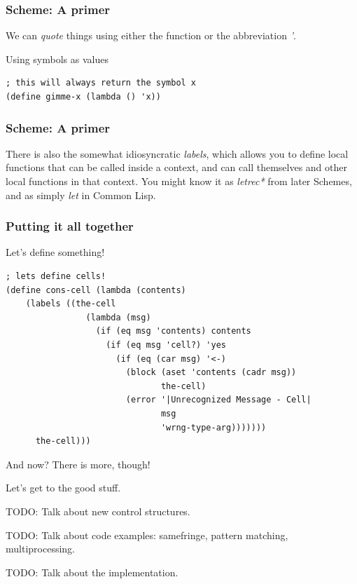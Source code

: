 \documentclass[aspectratio=169]{beamer}
\begin{document}
  \begin{frame}[fragile]
    \frametitle{Scheme: A primer}
    We can \textit{quote} things using either the function or the abbreviation
    \textit{'}.

    \begin{listing}[H]
      \caption{Using symbols as values}
      \begin{verbatim}
; this will always return the symbol x
(define gimme-x (lambda () 'x))
      \end{verbatim}
    \end{listing}
  \end{frame}
  \begin{frame}[fragile]
    \frametitle{Scheme: A primer}
    There is also the somewhat idiosyncratic \textit{labels}, which allows you
    to define local functions that can be called inside a context, and can call
    themselves and other local functions in that context. You might know it as
    \textit{letrec*} from later Schemes, and as simply \textit{let} in Common
    Lisp.
  \end{frame}
  \begin{frame}[fragile]
    \frametitle{Putting it all together}
    \begin{listing}[H]
      \caption{Let’s define something!}
      \begin{verbatim}
; lets define cells!
(define cons-cell (lambda (contents)
    (labels ((the-cell
                (lambda (msg)
                  (if (eq msg 'contents) contents
                    (if (eq msg 'cell?) 'yes
                      (if (eq (car msg) '<-)
                        (block (aset 'contents (cadr msg))
                               the-cell)
                        (error '|Unrecognized Message - Cell|
                               msg
                               'wrng-type-arg)))))))
      the-cell)))
      \end{verbatim}
    \end{listing}
  \end{frame}
  \begin{frame}{And now?}
    There is more, though!

    Let’s get to the good stuff.
  \end{frame}
  \begin{frame}
    TODO: Talk about new control structures.
  \end{frame}
  \begin{frame}
    TODO: Talk about code examples: samefringe, pattern matching, multiprocessing.
  \end{frame}
  \begin{frame}
    TODO: Talk about the implementation.
  \end{frame}
\end{document}
